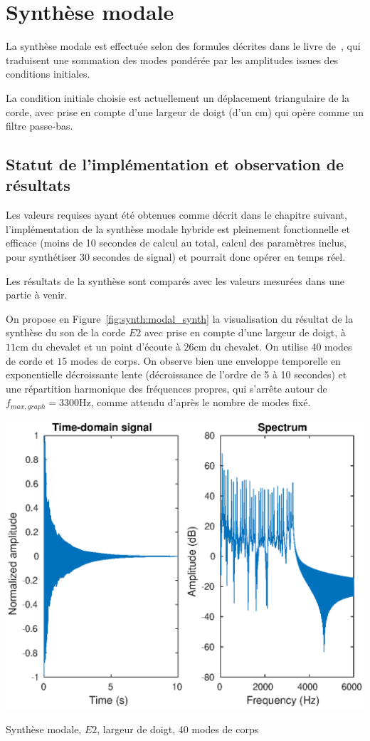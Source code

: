 \section{Synthèse modale}

  La synthèse modale est effectuée selon des formules décrites
dans le livre de~\textcite{newland}, qui traduisent une sommation des modes
pondérée par les amplitudes issues des conditions initiales.

  La condition initiale choisie est actuellement un déplacement triangulaire
de la corde, avec prise en compte d'une largeur de doigt (d'un \( \si{\cm} \))
qui opère comme un filtre passe-bas.

\subsection{Statut de l'implémentation et observation de résultats}

Les valeurs requises ayant été obtenues comme décrit dans le chapitre suivant,
l'implémentation de la synthèse modale hybride est pleinement fonctionnelle
et efficace (moins de 10 secondes de calcul au total, calcul des paramètres
inclus, pour synthétiser 30 secondes de signal) et pourrait donc opérer en
temps réel.

Les résultats de la synthèse sont comparés avec les valeurs mesurées dans une
partie à venir.

On propose en Figure~\ref{fig:synth:modal_synth} la visualisation du résultat
de la synthèse du son de la corde \( E2 \) avec prise en compte d'une largeur
de doigt, à \( \si{11\cm} \) du chevalet et un point d'écoute à
\( \si{26\cm} \) du chevalet.
On utilise \( 40 \) modes de corde et \( 15 \) modes de corps.
On observe bien une enveloppe temporelle en exponentielle décroissante lente
(décroissance de l'ordre de 5 à 10 secondes) et une répartition harmonique
des fréquences propres, qui s'arrête autour de
\( f_{max, graph} = \si{3300\Hz} \), comme attendu d'après le nombre de modes
fixé.

\begin{table}[hpbt]
\centering
\includegraphics[scale=0.6]{figures/modal_synthesis-E2-40_string_modes-15_body_modes-finger_pluck.eps}
 \caption{Synthèse modale, \( E2 \), largeur de doigt, \( 40 \) modes de corps
 \label{fig:synth:modal_synth}}
\end{table}
